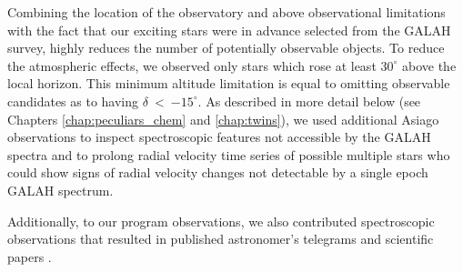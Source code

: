 Combining the location of the observatory and above observational limitations with the fact that our exciting stars were in advance selected from the GALAH survey, highly reduces the number of potentially observable objects. To reduce the atmospheric effects, we observed only stars which rose at least $30^\circ$ above the local horizon. This minimum altitude limitation is equal to omitting observable candidates as to having $\delta$~<~$-15^\circ$. As described in more detail below (see Chapters \ref{chap:peculiars_chem} and \ref{chap:twins}), we used additional Asiago observations to inspect spectroscopic features not accessible by the GALAH spectra and to prolong radial velocity time series of possible multiple stars who could show signs of radial velocity changes not detectable by a single epoch GALAH spectrum.

Additionally, to our program observations, we also contributed spectroscopic observations that resulted in published astronomer's telegrams \cite{2019ATel13340....1M} and scientific papers \cite{2019MNRAS.488.5536M}.
